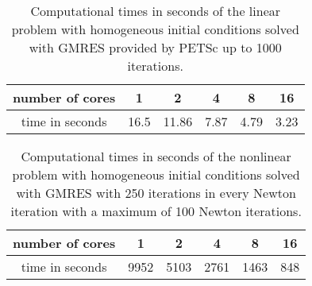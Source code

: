 \documentclass[12pt]{article}
\numberwithin{equation}{section}
\begin{document}
\begin{table}
\caption{Computational times in seconds of the linear problem with homogeneous initial conditions solved with GMRES provided by PETSc \cite{DaPaKlCo2011} up to 1000 iterations.}
\label{table:speedup_table_linprob_gmres}
\begin{center}
\begin{tabular}[tbhp]{ |c|c|c|c|c|c| } 
 \hline
 number of cores & 1 & 2 & 4 & 8 & 16\\
 \hline
 time in seconds & 16.5 & 11.86 & 7.87 & 4.79 & 3.23 \\ 
 \hline
\end{tabular}
\end{center}
\end{table}


\begin{table}
\caption{Computational times in seconds of the nonlinear problem with homogeneous initial conditions solved with GMRES with 250 iterations in every Newton iteration with a maximum of 100 Newton iterations.}
\label{table:speedup_table_nonlinprob_gmres}
\begin{center}
\begin{tabular}[tbhp]{ |c|c|c|c|c|c| }
 \hline
 number of cores & 1 & 2 & 4 & 8 & 16\\
 \hline
 time in seconds & 9952 & 5103 & 2761 & 1463 & 848 \\
 \hline
\end{tabular}
\end{center}
\end{table}
\end{document}
